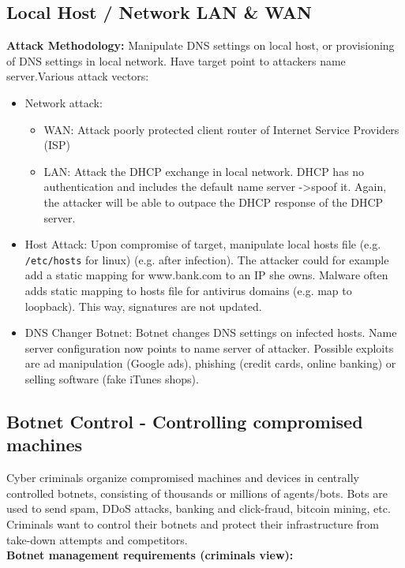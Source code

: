 \documentclass[11pt,oneside,a4paper]{article}
\begin{document}
\subsection{Local Host / Network LAN \& WAN}

\textbf{Attack Methodology:} Manipulate DNS settings on local host, or provisioning of DNS settings in local network. Have target point to attackers name server.Various attack vectors:

\vspace{-\topsep}
\begin{itemize}
	\setlength{\itemsep}{0pt}
	\setlength{\parskip}{0pt}
	\item Network attack:
	\begin{itemize}
		\item WAN: Attack poorly protected client router of Internet Service Providers (ISP)
		\item LAN: Attack the DHCP exchange in local network. DHCP has no authentication and includes the default name server -\textgreater spoof it. Again, the attacker will be able to outpace the DHCP response of the DHCP server.
	\end{itemize}
	\item Host Attack: Upon compromise of target, manipulate local hosts file (e.g. \texttt{/etc/hosts} for linux) (e.g. after infection). The attacker could for example add a static mapping for www.bank.com to an IP she owns. Malware often adds static mapping to hosts file for antivirus domains (e.g. map to loopback). This way, signatures are not updated.
	\item DNS Changer Botnet: Botnet changes DNS settings on infected hosts. Name server configuration now points to name server of attacker. Possible exploits are ad manipulation (Google ads), phishing (credit cards, online banking) or selling software (fake iTunes shops).
\end{itemize}
\vspace{-\topsep}

\subsection{Botnet Control - Controlling compromised machines}

Cyber criminals organize compromised machines and devices in centrally controlled botnets, consisting of thousands or millions of agents/bots. Bots are used to send spam, DDoS attacks, banking and click-fraud, bitcoin mining, etc. Criminals want to control their botnets and protect their infrastructure from take-down attempts and competitors.\\
\textbf{Botnet management requirements (criminals view):}
\end{document}
